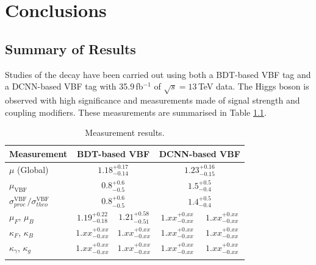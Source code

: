 \chapter{Conclusions}
\label{chap:conclusions}

\section{Summary of Results}
Studies of the \Hgg decay have been carried out using both a BDT-based VBF tag and a DCNN-based VBF tag with 35.9\,fb$^{-1}$ of $\sqrt{s}=13$\,TeV data. 
The Higgs boson is observed with high significance and measurements made of signal strength and coupling modifiers. 
These measurements are summarised in Table \ref{tab:conclusion:measurements}.
\begin{table}[h!]
    \centering
    \renewcommand{\arraystretch}{1.5}
    \begin{tabular}{ l | c c c c}
        \thickhline
        Measurement & \multicolumn{2}{c}{BDT-based VBF}  & \multicolumn{2}{c}{DCNN-based VBF} \\
        \hline
        $\mu$ (Global)                  & \multicolumn{2}{c}{$1.18^{+0.17}_{-0.14}$} & \multicolumn{2}{c}{$1.23^{+0.16}_{-0.15}$} \\
        $\mu_{\mathrm{VBF}} $           & \multicolumn{2}{c}{$0.8^{+0.6}_{-0.5}$} & \multicolumn{2}{c}{$1.5^{+0.5}_{-0.4}$} \\
        $\sigma^{\mathrm{VBF}}_{proc}/\sigma^{\mathrm{VBF}}_{theo}$ & \multicolumn{2}{c}{$0.8^{+0.6}_{-0.5}$} & \multicolumn{2}{c}{$1.4^{+0.5}_{-0.4}$} \\  
        $\mu_F$, $\mu_B$                & $1.19^{+0.22}_{-0.18}$ & $1.21^{+0.58}_{-0.51}$ & $1.xx^{+0.xx}_{-0.xx}$ & $1.xx^{+0.xx}_{-0.xx}$ \\
        $\kappa_F$, $\kappa_B$          & $1.xx^{+0.xx}_{-0.xx}$ & $1.xx^{+0.xx}_{-0.xx}$ & $1.xx^{+0.xx}_{-0.xx}$ & $1.xx^{+0.xx}_{-0.xx}$ \\ 
        $\kappa_{\gamma}$, $\kappa_{g}$ & $1.xx^{+0.xx}_{-0.xx}$ & $1.xx^{+0.xx}_{-0.xx}$ & $1.xx^{+0.xx}_{-0.xx}$ & $1.xx^{+0.xx}_{-0.xx}$ \\ 
        \thickhline
\end{tabular}
    \caption{Measurement results.}
    \label{tab:conclusion:measurements}
\end{table}


